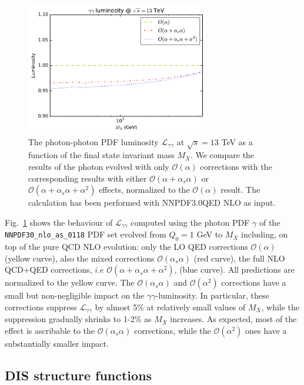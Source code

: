 \begin{figure}[t]
\includegraphics[width=8cm]{figs/lumi_13tev.pdf} 
\caption{The photon-photon PDF luminosity $\mathcal{L}_{\gamma\gamma}$ at $\sqrt{s} = 13$ TeV as a
  function of the final state invariant mass $M_X$.
  We compare the results of the photon evolved
  with only $\mathcal{O}(\alpha)$ corrections
  with the corresponding results with either
  $\mathcal{O}(\alpha+\alpha_s\alpha)$
  or $\mathcal{O}(\alpha+\alpha_s\alpha+\alpha^2)$ effects,
  normalized to the $\mathcal{O}(\alpha)$ result.
  The calculation has been performed with NNPDF3.0QED NLO as input.  }
\label{fig:GammaGammaLumi}
\end{figure}

Fig.~\ref{fig:GammaGammaLumi} shows the behaviour of
$\mathcal{L}_{\gamma\gamma}$ computed using the photon PDF $\gamma$ of the
{\tt NNPDF30\_nlo\_as\_0118} PDF set evolved from $Q_0 = 1$ GeV to
$M_X$ including, on top of the pure QCD NLO evolution: only the LO QED
corrections $\mathcal{O}(\alpha)$ (yellow curve), also the mixed
corrections $\mathcal{O}(\alpha_s\alpha)$ (red curve), the full NLO
QCD+QED corrections, $i.e$
$\mathcal{O}(\alpha+\alpha_s\alpha+\alpha^2)$, (blue curve). All
predictions are normalized to the yellow curve. The
$\mathcal{O}(\alpha_s\alpha)$ and $\mathcal{O}(\alpha^2)$ corrections
have a small but non-negligible impact on the
$\gamma\gamma$-luminosity. In particular, these corrections suppress
$\mathcal{L}_{\gamma\gamma}$ by almost 5\% at relatively small values of
$M_X$, while the suppression gradually shrinks to 1-2\% as $M_X$
increases. As expected, most of the effect is ascribable to the
$\mathcal{O}(\alpha_s\alpha)$ corrections, while the
$\mathcal{O}(\alpha^2)$ ones have a substantially smaller impact.

\subsection{DIS structure functions}

